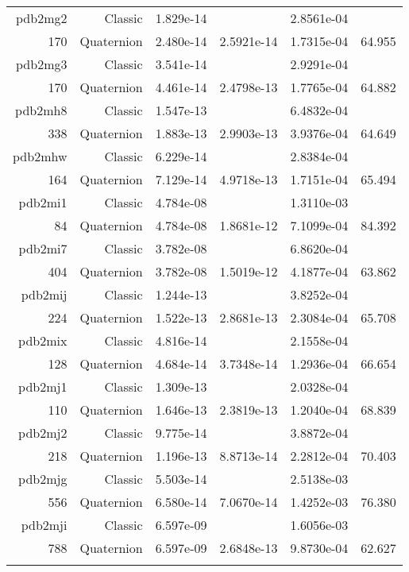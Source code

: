 \begin{xltabular}{\textwidth}{r|rS[table-format=1.3e+2]S[table-format=1.4e+2]S[table-format=1.4e+2]S[table-format=-1.3]}
pdb2mg2 & Classic & 1.829e-14 &  & 2.8561e-04 & \\
170 & Quaternion & 2.480e-14 & 2.5921e-14 & 1.7315e-04 & 64.955\\  \addlinespace
pdb2mg3 & Classic & 3.541e-14 &  & 2.9291e-04 & \\
170 & Quaternion & 4.461e-14 & 2.4798e-13 & 1.7765e-04 & 64.882\\  \addlinespace
pdb2mh8 & Classic & 1.547e-13 &  & 6.4832e-04 & \\
338 & Quaternion & 1.883e-13 & 2.9903e-13 & 3.9376e-04 & 64.649\\  \addlinespace
pdb2mhw & Classic & 6.229e-14 &  & 2.8384e-04 & \\
164 & Quaternion & 7.129e-14 & 4.9718e-13 & 1.7151e-04 & 65.494\\  \addlinespace
pdb2mi1 & Classic & 4.784e-08 &  & 1.3110e-03 & \\
84 & Quaternion & 4.784e-08 & 1.8681e-12 & 7.1099e-04 & 84.392\\  \addlinespace
pdb2mi7 & Classic & 3.782e-08 &  & 6.8620e-04 & \\
404 & Quaternion & 3.782e-08 & 1.5019e-12 & 4.1877e-04 & 63.862\\  \addlinespace
pdb2mij & Classic & 1.244e-13 &  & 3.8252e-04 & \\
224 & Quaternion & 1.522e-13 & 2.8681e-13 & 2.3084e-04 & 65.708\\  \addlinespace
pdb2mix & Classic & 4.816e-14 &  & 2.1558e-04 & \\
128 & Quaternion & 4.684e-14 & 3.7348e-14 & 1.2936e-04 & 66.654\\  \addlinespace
pdb2mj1 & Classic & 1.309e-13 &  & 2.0328e-04 & \\
110 & Quaternion & 1.646e-13 & 2.3819e-13 & 1.2040e-04 & 68.839\\  \addlinespace
pdb2mj2 & Classic & 9.775e-14 &  & 3.8872e-04 & \\
218 & Quaternion & 1.196e-13 & 8.8713e-14 & 2.2812e-04 & 70.403\\  \addlinespace
pdb2mjg & Classic & 5.503e-14 &  & 2.5138e-03 & \\
556 & Quaternion & 6.580e-14 & 7.0670e-14 & 1.4252e-03 & 76.380\\  \addlinespace
pdb2mji & Classic & 6.597e-09 &  & 1.6056e-03 & \\
788 & Quaternion & 6.597e-09 & 2.6848e-13 & 9.8730e-04 & 62.627\\  \addlinespace

\end{xltabular}
